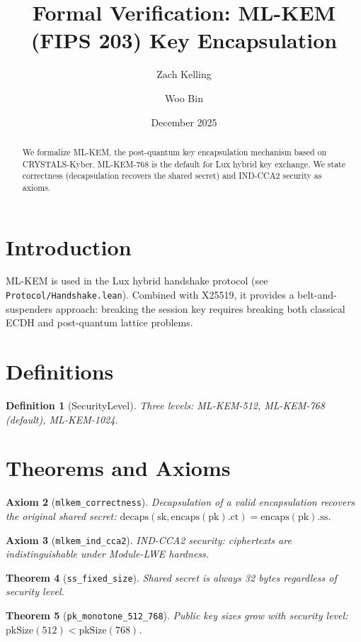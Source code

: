 \documentclass[11pt]{article}
\title{Formal Verification: ML-KEM (FIPS 203) Key Encapsulation}
\author{Zach Kelling \and Woo Bin}
\date{December 2025}
\newtheorem{theorem}{Theorem}
\newtheorem{definition}[theorem]{Definition}
\newtheorem{axiom_stmt}[theorem]{Axiom}
\begin{document}
\maketitle

\begin{abstract}
We formalize ML-KEM, the post-quantum key encapsulation mechanism based on CRYSTALS-Kyber. ML-KEM-768 is the default for Lux hybrid key exchange. We state correctness (decapsulation recovers the shared secret) and IND-CCA2 security as axioms.
\end{abstract}

\section{Introduction}
ML-KEM is used in the Lux hybrid handshake protocol (see \texttt{Protocol/Handshake.lean}). Combined with X25519, it provides a belt-and-suspenders approach: breaking the session key requires breaking both classical ECDH and post-quantum lattice problems.

\section{Definitions}
\begin{definition}[SecurityLevel]
Three levels: ML-KEM-512, ML-KEM-768 (default), ML-KEM-1024.
\end{definition}


\section{Theorems and Axioms}
\begin{axiom_stmt}[\texttt{mlkem\_correctness}]
Decapsulation of a valid encapsulation recovers the original shared secret: $\text{decaps}(\text{sk}, \text{encaps}(\text{pk}).\text{ct}) = \text{encaps}(\text{pk}).\text{ss}$.
\end{axiom_stmt}

\begin{axiom_stmt}[\texttt{mlkem\_ind\_cca2}]
IND-CCA2 security: ciphertexts are indistinguishable under Module-LWE hardness.
\end{axiom_stmt}

\begin{theorem}[\texttt{ss\_fixed\_size}]
Shared secret is always 32 bytes regardless of security level.
\end{theorem}

\begin{theorem}[\texttt{pk\_monotone\_512\_768}]
Public key sizes grow with security level: $\text{pkSize}(512) < \text{pkSize}(768)$.
\end{theorem}
\end{document}
